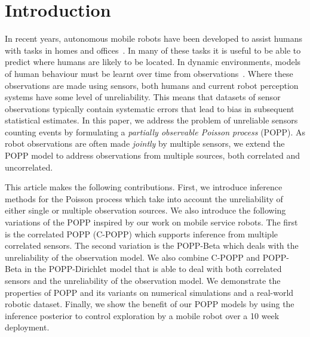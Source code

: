 

\section{Introduction}
\label{sec:introduction}

In recent years, autonomous mobile robots have been developed to assist humans with tasks in homes and offices~\cite{hawes2016strands}. In many of these tasks it is useful to be able to predict where humans are likely to be located. In dynamic environments, models of human behaviour must be learnt over time from observations~\cite{coppola2016learning, duckworth2016}. Where these observations are made using sensors, both humans and current robot perception systems have some level of unreliability. This means that datasets of sensor observations typically contain systematic errors that lead to bias in subsequent statistical estimates. In this paper, we address the problem of unreliable sensors counting events by formulating a \textit{partially observable Poisson process} (POPP). As robot observations are often made \emph{jointly} by multiple sensors, we extend the POPP model to address observations from multiple sources, both correlated and uncorrelated.

This article makes the following contributions. First, we introduce inference methods for the Poisson process which take into account the unreliability of either single or multiple observation sources. We also introduce the following variations of the POPP inspired by our work on mobile service robots. The first is the correlated POPP (C-POPP) which supports inference from multiple correlated sensors. The second variation is the POPP-Beta which deals with the unreliability of the observation model. We also combine C-POPP and POPP-Beta in the POPP-Dirichlet model that is able to deal with both correlated sensors and the unreliability of the observation model. We demonstrate the properties of POPP and its variants on numerical simulations and a real-world robotic dataset.
% 
Finally, we show the benefit of our POPP models by using the inference posterior to control exploration by a mobile robot over a 10 week deployment.
% 

